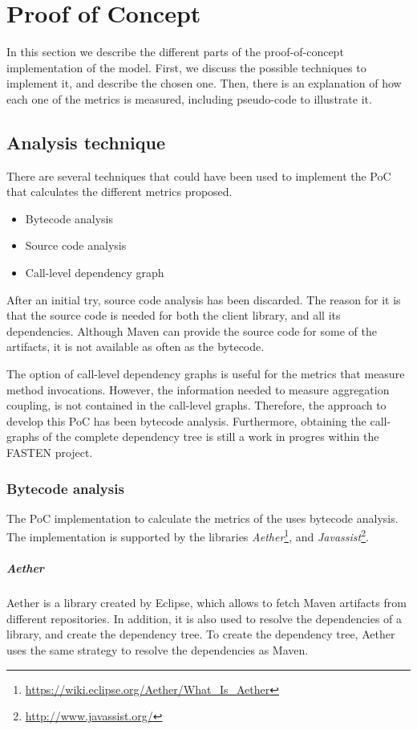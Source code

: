 \chapter{Proof of Concept}\label{ch:PoC}
In this section we describe the different parts of the proof-of-concept implementation of the model. First, we discuss the possible techniques to implement it, and describe the chosen one. Then, there is an explanation of how each one of the metrics is measured, including pseudo-code to illustrate it.

\section{Analysis technique}
There are several techniques that could have been used to implement the PoC that calculates the different metrics proposed.

\begin{itemize}
  \item Bytecode analysis
  \item Source code analysis
  \item Call-level dependency graph
\end{itemize}

After an initial try, source code analysis has been discarded. The reason for it is that the source code is needed for both the client library, and all its dependencies. Although Maven can provide the source code for some of the artifacts, it is not available as often as the bytecode.

The option of call-level dependency graphs is useful for the metrics that measure method invocations. However, the information needed to measure aggregation coupling, is not contained in the call-level graphs. Therefore, the approach to develop this PoC has been bytecode analysis. Furthermore, obtaining the call-graphs of the complete dependency tree is still a work in progres within the FASTEN project.

\subsection{Bytecode analysis}
The PoC implementation to calculate the metrics of the uses bytecode analysis. The implementation is supported by the libraries  \textit{Aether}\footnote{\url{https://wiki.eclipse.org/Aether/What_Is_Aether}}, and \textit{Javassist}\footnote{\url{http://www.javassist.org/}}.

\paragraph{Aether}
Aether is a library created by Eclipse, which allows to fetch Maven artifacts from different repositories. In addition, it is also used to resolve the dependencies of a library, and create the dependency tree. To create the dependency tree, Aether uses the same strategy to resolve the dependencies as Maven.

